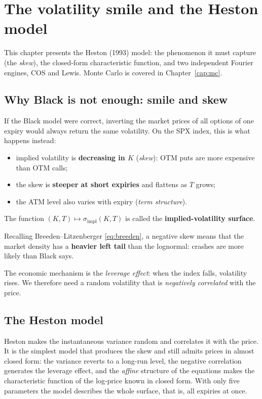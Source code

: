 \chapter{The volatility smile and the Heston model}
\label{cap:heston}

This chapter presents the Heston (1993) model: the phenomenon it must capture (the \emph{skew}), the closed-form
characteristic function, and two independent Fourier engines, COS and Lewis. Monte Carlo is covered in
Chapter~\ref{cap:mc}.

\section{Why Black is not enough: smile and skew}
If the Black model were correct, inverting the market prices of all options of one expiry would always return the
same volatility. On the SPX index, this is what happens instead:
\begin{itemize}
\item implied volatility is \textbf{decreasing in $K$} (\emph{skew}): OTM puts are more expensive than OTM calls;
\item the skew is \textbf{steeper at short expiries} and flattens as $T$ grows;
\item the ATM level also varies with expiry (\emph{term structure}).
\end{itemize}
The function $(K,T)\mapsto\sigma_{\text{impl}}(K,T)$ is called the \textbf{implied-volatility surface}.

\begin{perche}[title={Why is there a skew?}]
Recalling Breeden--Litzenberger \eqref{eq:breeden}, a negative skew means that the market density has a
\textbf{heavier left tail} than the lognormal: crashes are more likely than Black says.

The economic mechanism is the \emph{leverage effect}: when the index falls, volatility rises. We therefore need a
random volatility that is \emph{negatively correlated} with the price.
\end{perche}

\section{The Heston model}
Heston makes the instantaneous variance random and correlates it with the price. It is the simplest model that
produces the skew and still admits prices in almost closed form: the variance reverts to a long-run level, the
negative correlation generates the leverage effect, and the \emph{affine} structure of the equations makes the
characteristic function of the log-price known in closed form. With only five parameters the model describes the
whole surface, that is, all expiries at once.

